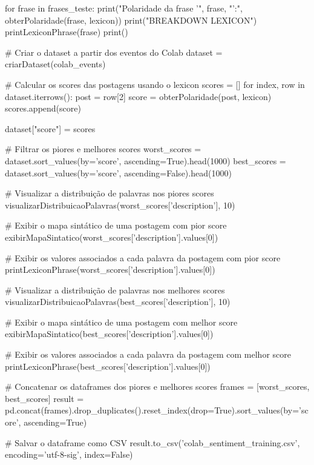 \begin{codigo}[caption={Código de treinamento para análise de sentimento}, label={codigo:lex_train}, language=Python, breaklines=true]
for frase in frases_teste:
  print("Polaridade da frase '", frase, "':", obterPolaridade(frase, lexicon))
  print("BREAKDOWN LEXICON")
  printLexiconPhrase(frase)
  print()

# Criar o dataset a partir dos eventos do Colab
dataset = criarDataset(colab_events)

# Calcular os scores das postagens usando o lexicon
scores = []
for index, row in dataset.iterrows():
  post = row[2]
  score = obterPolaridade(post, lexicon)
  scores.append(score)

dataset["score"] = scores

# Filtrar os piores e melhores scores
worst_scores = dataset.sort_values(by='score', ascending=True).head(1000)
best_scores = dataset.sort_values(by='score', ascending=False).head(1000)

# Visualizar a distribuição de palavras nos piores scores
visualizarDistribuicaoPalavras(worst_scores['description'], 10)

# Exibir o mapa sintático de uma postagem com pior score
exibirMapaSintatico(worst_scores['description'].values[0])

# Exibir os valores associados a cada palavra da postagem com pior score
printLexiconPhrase(worst_scores['description'].values[0])

# Visualizar a distribuição de palavras nos melhores scores
visualizarDistribuicaoPalavras(best_scores['description'], 10)

# Exibir o mapa sintático de uma postagem com melhor score
exibirMapaSintatico(best_scores['description'].values[0])

# Exibir os valores associados a cada palavra da postagem com melhor score
printLexiconPhrase(best_scores['description'].values[0])

# Concatenar os dataframes dos piores e melhores scores
frames = [worst_scores, best_scores]
result = pd.concat(frames).drop_duplicates().reset_index(drop=True).sort_values(by='score', ascending=True)

# Salvar o dataframe como CSV
result.to_csv('colab_sentiment_training.csv', encoding='utf-8-sig', index=False) 
\end{codigo}
